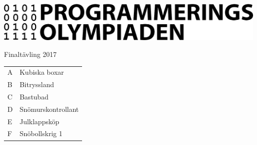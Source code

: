 \documentclass{article}
\begin{document}
\pagestyle{empty}
  \includegraphics[width=\textwidth]{logo.png}
  \\[4em]
\begin{center}
  \Huge{Finaltävling 2017}
  \\[6em]
  \LARGE{
  \begin{tabular}{ll}
    A & Kubiska boxar \\
    B & Bitryssland \\
    C & Bastubad \\
    D & Snömurskontrollant \\
    E & Julklappsköp \\
    F & Snöbollskrig 1 \\
  \end{tabular}
}
\end{center}
\end{document}

